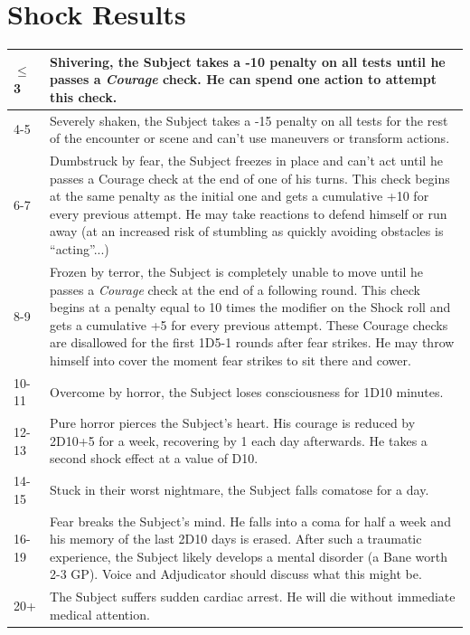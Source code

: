 	\section{Shock Results}
\label{feartable}
\begin{tabularx}{\textwidth}{|l|X|}
	\hline
	$\le$ 3 &
		Shivering, the Subject takes a -10 penalty on all tests
		until he passes a \emph{Courage} check.
		He can spend one action to attempt this check.
		\\ \hline
	4-5   & Severely shaken, the Subject takes a -15 penalty
		on all tests for the rest of the encounter or scene
		and can't use maneuvers or transform actions.
		\\ \hline
	6-7   & Dumbstruck by fear,
			the Subject freezes in place and can’t act until he passes a Courage check at the end of one of his turns.
		This check begins at the same penalty as the initial one and gets a cumulative +10 for every previous attempt.
		He may take reactions to defend himself or run away
			(at an increased risk of stumbling as quickly avoiding obstacles is “acting”...)
		\\ \hline
	8-9 &
		Frozen by terror, the Subject is completely unable to move
		until he passes a \emph{Courage} check at the end of a following round.
		This check begins at a penalty equal to 10 times the modifier on the Shock roll
		and gets a cumulative +5 for every previous attempt.
		These Courage checks are disallowed for the first 1D5-1 rounds after fear strikes.
		He may throw himself into cover the moment fear strikes to sit there and cower.
		\\ \hline
	10-11  & Overcome by horror, the Subject loses consciousness for 1D10 minutes.
	\\ \hline
	12-13 &
		Pure horror pierces the Subject’s heart.
		His courage is reduced by 2D10+5 for a week,
		recovering by 1 each day afterwards.
		He takes a second shock effect at a value of D10.
		\\ \hline
	14-15  & Stuck in their worst nightmare, the Subject falls comatose for a day.
		\\ \hline
	16-19  & Fear breaks the Subject’s mind.
		He falls into a coma for half a week and his memory of the last 2D10 days is erased.
		After such a traumatic experience, the Subject likely develops a mental disorder (a Bane worth 2-3 GP).
		Voice and Adjudicator should discuss what this might be.
		\\ \hline
	20+ &
		The Subject suffers sudden cardiac arrest.
		He will die without immediate medical attention.
		\\ \hline
\end{tabularx}
